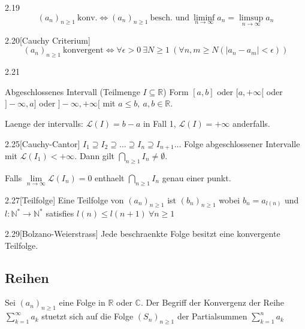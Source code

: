 \documentclass[8pt,a4paper,twocolumn,table]{extarticle}
\newcommand{\N}{\mathbb{N}}
\newcommand{\R}{\mathbb{R}}
\newcommand{\seq}[1]{\left( #1_n \right)_{n \ge 1}}
\begin{document}
\begin{lemma}{2.19}
    \[
        \seq{a}\ \mbox{konv.} \Leftrightarrow \seq{a}\ \mbox{besch. und}\ \liminf_{n \to \infty} a_n = \limsup_{n \to \infty} a_n
    \]
\end{lemma}

\begin{satz}{2.20}[Cauchy Criterium]
    \label{satz:cauchy-criterium-folge}
    \[ \seq{a}\ \mbox{konvergent} \Leftrightarrow \forall \epsilon > 0\
        \exists N \ge 1\ \left( \forall n,m \ge N \left( \lvert a_n - a_m \rvert < \epsilon \right) \right) \]
\end{satz}

\begin{definition}{2.21}
    \par Abgeschlossenes Intervall (Teilmenge $I \subseteq \R$)
    Form $[a,b]$ oder $[a, +\infty[$ oder $]-\infty, a]$ oder $]-\infty, +\infty[$ mit $a \le b,\ a,b \in \R$.

    Laenge der intervalls: $\mathcal{L}(I) = b - a$ in Fall 1, $\mathcal{L}(I) = +\infty$ anderfalls.
\end{definition}

\begin{satz}{2.25}[Cauchy-Cantor]
    \label{satz:cauchy-cantor}
    $I_1 \supseteq I_2 \supseteq \dots \supseteq I_n \supseteq I_{n + 1} \dots$ Folge abgeschlossener Intervalle mit $\mathcal{L}(I_1) < +\infty$.
    Dann gilt $\bigcap_{n \ge 1} I_n \ne \emptyset$.

    Falls $\underset{n \to \infty}{\lim} \mathcal{L}(I_n) = 0$ enthaelt $\bigcap_{n \ge 1} I_n$ genau einer punkt.
\end{satz}

\begin{definition}{2.27}[Teilfolge]
    Eine Teilfolge von $\seq{a}$ ist $\seq{b}$ wobei $b_n = a_{l(n)}$ und $l: \N^* \to \N^*$ satisfies $l(n) \le l(n + 1)\ \forall n \ge 1$
\end{definition}

\begin{satz}{2.29}[Bolzano-Weierstrass]
    \label{satz:bolzano-weierstrass}
    Jede beschraenkte Folge besitzt eine konvergente Teilfolge.
\end{satz}

\subsection{Reihen}
Sei $\seq{a}$ eine Folge in $\R$ oder $\mathbb{C}$. Der Begriff der Konvergenz der Reihe $\sum_{k = 1}^{\infty} a_k$ stuetzt sich auf die
Folge $\seq{S}$ der Partialsummen $\sum_{k = 1}^n a_k$
\end{document}
